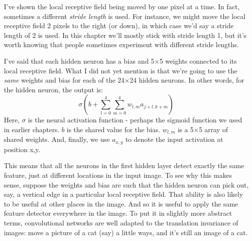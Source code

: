 I've shown the local receptive field being moved by one pixel at a time. In fact, sometimes a different \textit{stride length} is used. For instance, we might move the local receptive field 2 pixels to the right (or down), in which case we'd say a stride length of 2 is used. In this chapter we'll mostly stick with stride length 1, but it's worth knowing that people sometimes experiment with different stride lengths.

 I've said that each hidden neuron has a bias and 5$\times$5 weights connected to its local receptive field. What I did not yet mention is that we're going to use the \textit{same} weights and bias for each of the 24$\times$24 hidden neurons. In other words, for the  hidden neuron, the output is: 
\begin{equation}
    \sigma\left(b+\sum_{l=0}^{4} \sum_{m=0}^{4} w_{l, m} a_{j+l, k+m}\right)
\label{eq:c05-125}
    \end{equation}
Here, $\sigma$ is the neural activation function - perhaps the sigmoid function we used in earlier chapters. $b$ is the shared value for the bias. $w_{l,m}$ is a 5$\times$5 array of shared weights. And, finally, we use $a_{x,y}$ to denote the input activation at position {x,y}.

This means that all the neurons in the first hidden layer detect exactly the same feature, just at different locations in the input image. To see why this makes sense, suppose the weights and bias are such that the hidden neuron can pick out, say, a vertical edge in a particular local receptive field. That ability is also likely to be useful at other places in the image. And so it is useful to apply the same feature detector everywhere in the image. To put it in slightly more abstract terms, convolutional networks are well adapted to the translation invariance of images: move a picture of a cat (say) a little ways, and it's still an image of a cat.

